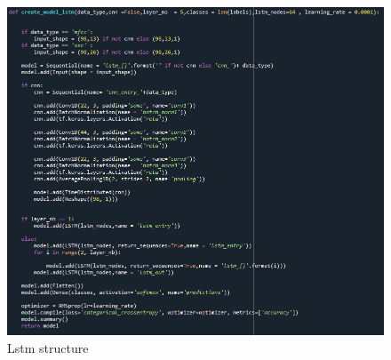 \begin{figure}[h!]
    \centering
    \includegraphics[width=1\textwidth]{chapters/pictures/lstm.PNG}
    \caption{Lstm structure}
    \label{fig:lstm}
\end{figure}


